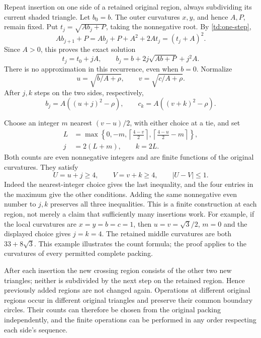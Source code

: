 \documentclass[11pt]{article}
\numberwithin{equation}{section}
\theoremstyle{definition}
\begin{document}
Repeat insertion on one side of a retained original region, always
subdividing its current shaded triangle. Let \(b_0=b\). The outer
curvatures \(x,y\), and hence \(A,P\), remain fixed. Put
\(t_j=\sqrt{Ab_j+P}\), taking the nonnegative root. By
\eqref{td:one-step},
\[
 Ab_{j+1}+P=Ab_j+P+A^2+2At_j=(t_j+A)^2.
 \]
Since \(A>0\), this proves the exact solution
\begin{equation}\label{td:recurrence}
 t_j=t_0+jA,\qquad
 b_j=b+2j\sqrt{Ab+P}+j^2A.
\end{equation}
There is no approximation in this recurrence, even when \(b=0\).
Normalize
\[
 u=\sqrt{b/A+\rho},\qquad v=\sqrt{c/A+\rho}.
\]
After \(j,k\) steps on the two sides, respectively,
\begin{equation}\label{td:normalized}
 b_j=A((u+j)^2-\rho),\qquad
 c_k=A((v+k)^2-\rho).
\end{equation}

Choose an integer \(m\) nearest \((v-u)/2\), with either choice
at a tie, and set
\begin{equation}\label{td:counts}
 \begin{aligned}
 L&=\max\left\{0,-m,
       \left\lceil\frac{4-v}{2}\right\rceil,
       \left\lceil\frac{4-u}{2}-m\right\rceil\right\},\\
 j&=2(L+m),\qquad k=2L .
 \end{aligned}
\end{equation}
Both counts are even nonnegative integers and are finite functions
of the original curvatures. They satisfy
\begin{equation}\label{td:balanced-root}
 U=u+j\ge4,\qquad V=v+k\ge4,\qquad |U-V|\le1.
\end{equation}
Indeed the nearest-integer choice gives the last inequality, and
the four entries in the maximum give the other conditions.
Adding the same nonnegative even number to \(j,k\) preserves all
three inequalities. This is a finite construction at each region,
not merely a claim that sufficiently many insertions work.
For example, if the local curvatures are $x=y=b=c=1$, then
$u=v=\sqrt3/2$, $m=0$ and the displayed choice gives $j=k=4$.
The retained middle curvatures are both $33+8\sqrt3$. This example
illustrates the count formula; the proof applies to the curvatures
of every permitted complete packing.

After each insertion the new crossing region consists of the other
two new triangles; neither is subdivided by the next step on the
retained region. Hence previously added regions are not changed
again. Operations at different original regions occur in different
original triangles and preserve their common boundary circles.
Their counts can therefore be chosen from the original packing
independently, and the finite operations can be performed in any
order respecting each side's sequence.
\end{document}
